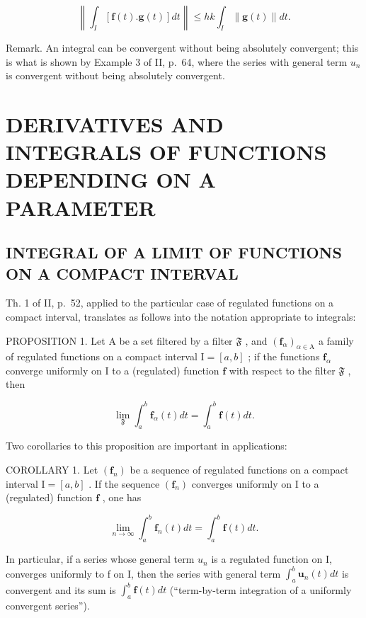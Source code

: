 \[
\left\| \int_ {I} [ \mathbf {f} (t). \mathbf {g} (t) ] d t \right\| \leqslant h k \int_ {I} \| \mathbf {g} (t) \| d t.
\]

Remark. An integral can be convergent without being absolutely convergent; this is what is shown by Example 3 of II, p.~64, where the series with general term \(u_{n}\) is convergent without being absolutely convergent.

\section{DERIVATIVES AND INTEGRALS OF FUNCTIONS DEPENDING ON A PARAMETER}

\subsection{INTEGRAL OF A LIMIT OF FUNCTIONS ON A COMPACT INTERVAL}

Th. 1 of II, p.~52, applied to the particular case of regulated functions on a compact interval, translates as follows into the notation appropriate to integrals:

PROPOSITION 1. Let A be a set filtered by a filter \(\mathfrak{F}\) , and \((\mathbf{f}_{\alpha})_{\alpha \in \mathrm{A}}\) a family of regulated functions on a compact interval \(\mathrm{I} = [a, b]\) ; if the functions \(\mathbf{f}_{\alpha}\) converge uniformly on I to a (regulated) function \(\mathbf{f}\) with respect to the filter \(\mathfrak{F}\) , then

\[
\lim _ {\mathfrak {F}} \int_ {a} ^ {b} \mathbf {f} _ {\alpha} (t) d t = \int_ {a} ^ {b} \mathbf {f} (t) d t.\tag{1}
\]

Two corollaries to this proposition are important in applications:

COROLLARY 1. Let \((\mathbf{f}_n)\) be a sequence of regulated functions on a compact interval \(\mathrm{I} = [a, b]\) . If the sequence \((\mathbf{f}_n)\) converges uniformly on \(\mathrm{I}\) to a (regulated) function \(\mathbf{f}\) , one has

\[
\lim _ {n \rightarrow \infty} \int_ {a} ^ {b} \mathbf {f} _ {n} (t) d t = \int_ {a} ^ {b} \mathbf {f} (t) d t.\tag{2}
\]

In particular, if a series whose general term \(u_{n}\) is a regulated function on I, converges uniformly to f on I, then the series with general term \(\int_{a}^{b}\mathbf{u}_{n}(t)dt\) is convergent and its sum is \(\int_{a}^{b}\mathbf{f}(t)dt\) (``term-by-term integration of a uniformly convergent series'').

